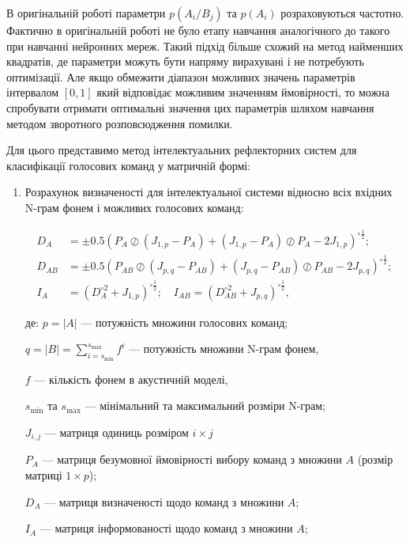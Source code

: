 В оригінальній роботі\cite{Teslia_2014} параметри $p(A_i/B_j)$ та $p(A_i)$ розраховуються частотно. Фактично в оригінальній роботі не було етапу навчання аналогічного до такого при навчанні нейронних мереж. Такий підхід більше схожий на метод найменших квадратів, де параметри можуть бути напряму вирахувані і не потребують оптимізації.
Але якщо обмежити діапазон можливих значень параметрів інтервалом $[0, 1]$ який відповідає можливим значенням ймовірності, то можна спробувати отримати оптимальні значення цих параметрів шляхом навчання методом зворотного розповсюдження помилки.

Для цього представимо метод інтелектуальних рефлекторних систем для класифікації голосових команд у матричній формі:

\begin{enumerate}
	\item Розрахунок визначеності для інтелектуальної системи відносно всіх вхідних N-грам фонем і можливих голосових команд:
	
	\begin{align}
		D_A&=\pm0.5(P_{A}\oslash(J_{1,p}-P_{A}) + (J_{1,p}-P_{A})\oslash P_{A} -2J_{1,p})^{\circ \frac{1}{2}}; \nonumber \\
		D_{AB}&=\pm0.5(P_{AB}\oslash(J_{p,q}-P_{AB}) + (J_{p,q}-P_{AB})\oslash P_{AB}-2J_{p,q})^{\circ \frac{1}{2}}; \nonumber \\
		I_A&=(D_A^{\circ 2}+J_{1,p})^{\circ \frac{1}{2}};\quad I_{AB}=(D_{AB}^{\circ 2}+J_{p,q})^{\circ \frac{1}{2}}, \nonumber
	\end{align}
	
	де: $p=|A|$ --- потужність множини голосових команд;
	
	{\settowidth{\leftskip}{де:\ }
		
		$q=|B|=\sum_{i=s_{\text{min}}}^{s_{\text{max}}}f^i$ --- потужність множини N-грам фонем,
		
		$f$ --- кількість фонем в акустичній моделі,
		
		$s_{\text{min}}$ та $s_{\text{max}}$ --- мінімальний та максимальний розміри N-грам;
		
		$J_{i,j}$ --- матриця одиниць розміром $i\times j$
		
		$P_{A}$ --- матриця безумовної ймовірності вибору команд з множини $A$ (розмір матриці $1\times p$); 
		
		$D_A$ --- матриця визначеності щодо команд з множини $A$; 
		
		$I_A$ --- матриця інформованості щодо команд з множини $A$; 
		
}
\end{enumerate}
